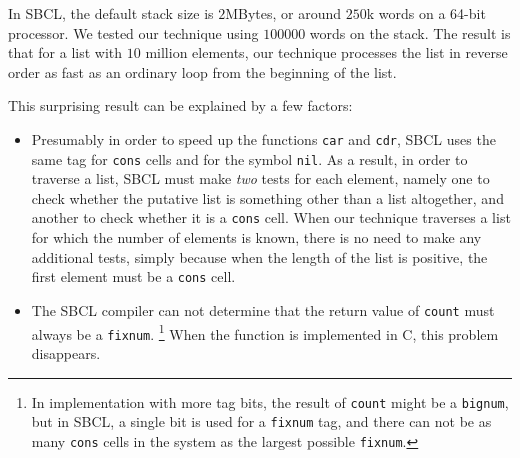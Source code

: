 In SBCL, the default stack size is $2$MBytes, or around $250$k words
on a 64-bit processor.  We tested our technique using $100000$ words
on the stack.  The result is that for a list with $10$ million
elements, our technique processes the list in reverse order as fast as
an ordinary loop from the beginning of the list.

This surprising result can be explained by a few factors:

\begin{itemize}
\item Presumably in order to speed up the functions \texttt{car} and
  \texttt{cdr}, SBCL uses the same tag for \texttt{cons} cells and for
  the symbol \texttt{nil}.  As a result, in order to traverse a list,
  SBCL must make \emph{two} tests for each element, namely one to
  check whether the putative list is something other than a list
  altogether, and another to check whether it is a \texttt{cons}
  cell.  When our technique traverses a list for which the number of
  elements is known, there is no need to make any additional tests,
  simply because when the length of the list is positive, the first
  element must be a \texttt{cons} cell.
\item The SBCL compiler can not determine that the return value of
  \texttt{count} must always be a \texttt{fixnum}.%
  \footnote{In implementation with more tag bits, the result of
    \texttt{count} might be a \texttt{bignum}, but in SBCL, a single
    bit is used for a \texttt{fixnum} tag, and there can not be as
    many \texttt{cons} cells in the system as the largest possible
    \texttt{fixnum}.}
  When the function is implemented in C, this problem disappears.
\end{itemize}

